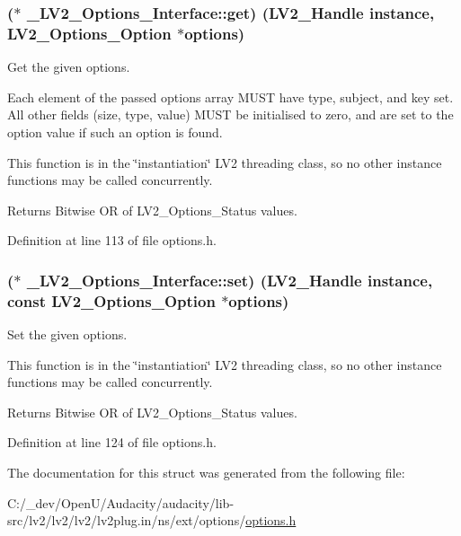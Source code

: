 \subsubsection[{\texorpdfstring{get}{get}}]{($\ast$ \+\_\+\+L\+V2\+\_\+\+Options\+\_\+\+Interface\+::get) ({\bf L\+V2\+\_\+\+Handle} instance, {\bf L\+V2\+\_\+\+Options\+\_\+\+Option} $\ast$options)}\hypertarget{struct___l_v2___options___interface_ae2aa36ed629f52be73adacf984b50239}{}\label{struct___l_v2___options___interface_ae2aa36ed629f52be73adacf984b50239}
Get the given options.

Each element of the passed options array M\+U\+ST have type, subject, and key set. All other fields (size, type, value) M\+U\+ST be initialised to zero, and are set to the option value if such an option is found.

This function is in the \char`\"{}instantiation\char`\"{} L\+V2 threading class, so no other instance functions may be called concurrently.

\begin{DoxyReturn}{Returns}
Bitwise OR of L\+V2\+\_\+\+Options\+\_\+\+Status values. 
\end{DoxyReturn}


Definition at line 113 of file options.\+h.

\subsubsection[{\texorpdfstring{set}{set}}]{($\ast$ \+\_\+\+L\+V2\+\_\+\+Options\+\_\+\+Interface\+::set) ({\bf L\+V2\+\_\+\+Handle} instance, {\bf const} {\bf L\+V2\+\_\+\+Options\+\_\+\+Option} $\ast$options)}\hypertarget{struct___l_v2___options___interface_a8ebef3778792929fe9473d25d3ce4a4b}{}\label{struct___l_v2___options___interface_a8ebef3778792929fe9473d25d3ce4a4b}
Set the given options.

This function is in the \char`\"{}instantiation\char`\"{} L\+V2 threading class, so no other instance functions may be called concurrently.

\begin{DoxyReturn}{Returns}
Bitwise OR of L\+V2\+\_\+\+Options\+\_\+\+Status values. 
\end{DoxyReturn}


Definition at line 124 of file options.\+h.



The documentation for this struct was generated from the following file\+:\begin{DoxyCompactItemize}
\item 
C\+:/\+\_\+dev/\+Open\+U/\+Audacity/audacity/lib-\/src/lv2/lv2/lv2/lv2plug.\+in/ns/ext/options/\hyperlink{lv2_2lv2_2lv2_2lv2plug_8in_2ns_2ext_2options_2options_8h}{options.\+h}\end{DoxyCompactItemize}
